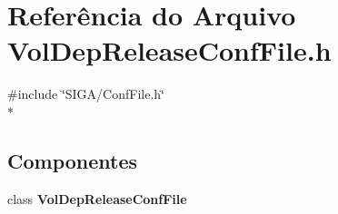 \section{Referência do Arquivo Vol\+Dep\+Release\+Conf\+File.\+h}
\label{_vol_dep_release_conf_file_8h}
{\ttfamily \#include \char`\"{}S\+I\+G\+A/\+Conf\+File.\+h\char`\"{}}\\*
\subsection*{Componentes}
\begin{DoxyCompactItemize}
\item 
class {\bf Vol\+Dep\+Release\+Conf\+File}
\end{DoxyCompactItemize}
